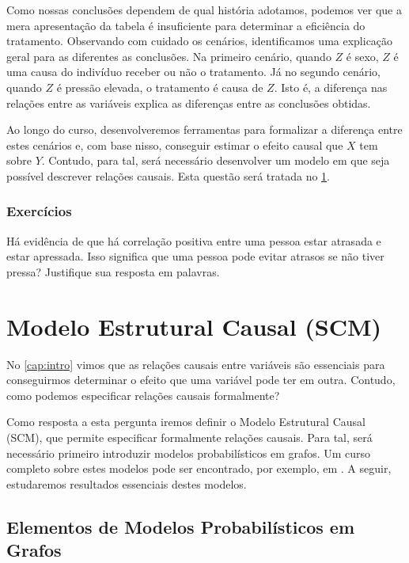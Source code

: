 Como nossas conclusões dependem de qual história adotamos,
podemos ver que a mera apresentação da tabela é
insuficiente para determinar a eficiência do tratamento.
Observando com cuidado os cenários,
identificamos uma explicação geral para
as diferentes as conclusões.
Na primeiro cenário, quando $Z$ é sexo,
$Z$ é uma causa do indivíduo receber ou não o tratamento.
Já no segundo cenário, quando $Z$ é pressão elevada,
o tratamento é causa de $Z$. Isto é,
a diferença nas relações entre as variáveis
explica as diferenças entre as conclusões obtidas.

Ao longo do curso, desenvolveremos ferramentas para
formalizar a diferença entre estes cenários e, com base nisso,
conseguir estimar o efeito causal que $X$ tem sobre $Y$.
Contudo, para tal, será necessário desenvolver
um modelo em que seja possível descrever relações causais.
Esta questão será tratada no \cref{cap:dag}.

\subsection{Exercícios}

\begin{exercise}
 Há evidência de que há correlação positiva entre
 uma pessoa estar atrasada e estar apressada.
 Isso significa que uma pessoa pode evitar atrasos
 se não tiver pressa? 
 Justifique sua resposta em palavras.
\end{exercise}

\chapter{Modelo Estrutural Causal (SCM)}
\label{cap:dag}

No \cref{cap:intro} vimos que 
as relações causais entre variáveis são
essenciais para conseguirmos determinar
o efeito que uma variável pode ter em outra.
Contudo, como podemos especificar
relações causais formalmente?

Como resposta a esta pergunta iremos
definir o Modelo Estrutural Causal (SCM),
que permite especificar formalmente relações causais.
Para tal, será necessário primeiro introduzir
modelos probabilísticos em grafos.
Um curso completo sobre estes modelos 
pode ser encontrado, por exemplo,
em \citet{Maua2022}.
A seguir, estudaremos resultados
essenciais destes modelos.

\section{Elementos de Modelos Probabilísticos em Grafos}

